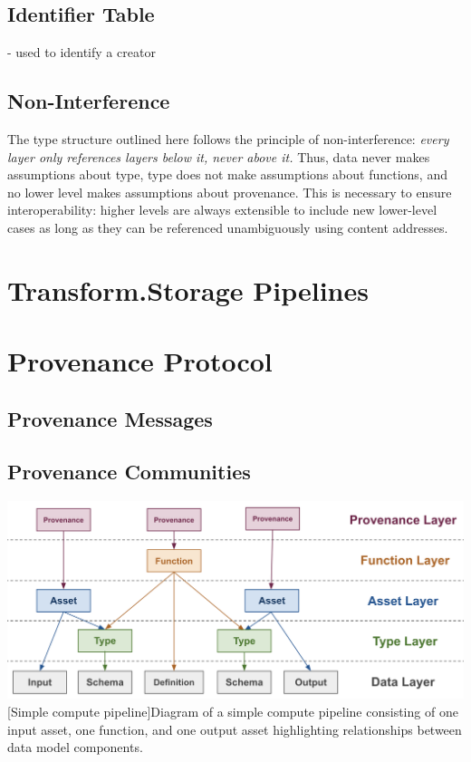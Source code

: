 \documentclass[9pt, oneside]{article}   	%
\begin{document}
\begin{multicols}{2}
\vspace{.25 cm}

\subsection{Identifier Table}\label{transformID}
- used to identify a creator

\subsection{Non-Interference}\label{nonInterference}
The type structure outlined here follows the principle of non-interference: \textit{every layer only references layers below it, never above it.} Thus, data never makes assumptions about type, type does not make assumptions about functions, and no lower level makes assumptions about provenance. This is necessary to ensure interoperability: higher levels are always extensible to include new lower-level cases as long as they can be referenced unambiguously using content addresses. 

\section{Transform.Storage Pipelines}\label{transformpipes}

\section{Provenance Protocol}\label{provprotocol}

\subsection{Provenance Messages}\label{provMessages}

\subsection{Provenance Communities}\label{provCommunities}





\end{multicols}
\begin{center}
    
\includegraphics[width=1\columnwidth]{pipeline_layers_20230715}
[Simple compute pipeline]{Diagram of a simple compute pipeline consisting of one input asset, one function, and one output asset highlighting relationships between data model components.}
\label{simplePipeline}
\end{center}
\end{document}

